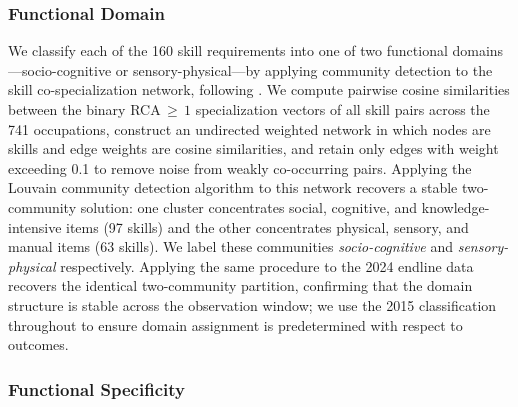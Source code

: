 \documentclass[11pt, letterpaper]{article} %
\newcommand{\parencite}[1]{\cite{#1}}
\newcommand{\textcite}[1]{\cite{#1}}
\begin{document}
\subsubsection{Functional Domain}
\label{sec:SI_domain}
 
We classify each of the 160 skill requirements into one of two functional domains---socio-cognitive or sensory-physical---by applying community detection to the skill co-specialization network, following \textcite{alabdulkareem_unpacking_2018}. We compute pairwise cosine similarities between the binary RCA$\,{\geq}\,1$ specialization vectors of all skill pairs across the 741 occupations, construct an undirected weighted network in which nodes are skills and edge weights are cosine similarities, and retain only edges with weight exceeding 0.1 to remove noise from weakly co-occurring pairs. Applying the Louvain community detection algorithm \parencite{blondel_fast_2008} to this network recovers a stable two-community solution: one cluster concentrates social, cognitive, and knowledge-intensive items (97 skills) and the other concentrates physical, sensory, and manual items (63 skills). We label these communities \textit{socio-cognitive} and \textit{sensory-physical} respectively. Applying the same procedure to the 2024 endline data recovers the identical two-community partition, confirming that the domain structure is stable across the observation window; we use the 2015 classification throughout to ensure domain assignment is predetermined with respect to outcomes.
 
\subsubsection{Functional Specificity}
\label{sec:SI_specificity}
 
\end{document}
